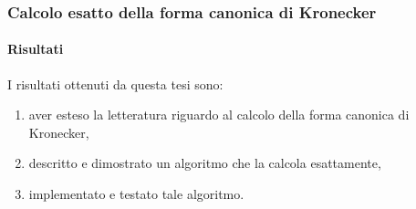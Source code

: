 \begin{frame}
	\frametitle{Calcolo esatto della forma canonica di Kronecker}
	\framesubtitle{Risultati}
	I risultati ottenuti da questa tesi sono:
	\begin{enumerate}
		\item aver esteso la letteratura riguardo al calcolo della forma canonica di Kronecker,
		\item descritto e dimostrato un algoritmo che la calcola esattamente,
		\item implementato e testato tale algoritmo.
	\end{enumerate}
\end{frame}